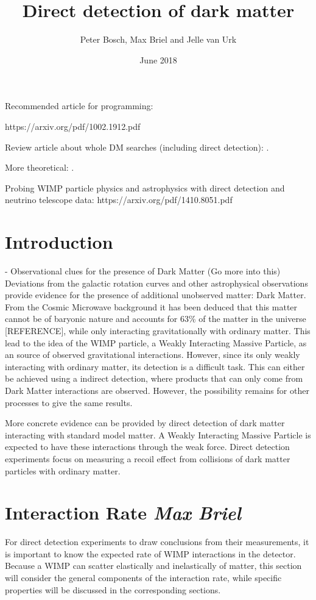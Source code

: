 \documentclass{article}
\title{Direct detection of dark matter}
\author{Peter Bosch, Max Briel and Jelle van Urk}
\date{June 2018}
\begin{document}
\maketitle

Recommended article for programming:

https://arxiv.org/pdf/1002.1912.pdf

Review article about whole DM searches (including direct detection): \cite{Roszkowski:2017nbc}.

More theoretical: \cite{Queiroz:2017kxt}.

Probing WIMP particle physics and astrophysics with direct detection and neutrino telescope data:
https://arxiv.org/pdf/1410.8051.pdf

\section{Introduction}


- Observational clues for the presence of Dark Matter (Go more into this) 
Deviations from the galactic rotation curves and other astrophysical observations provide evidence for the presence of additional unobserved matter: Dark Matter. From the Cosmic Microwave background it has been deduced that this matter cannot be of baryonic nature and accounts for 63\% of the matter in the universe [REFERENCE], while only interacting gravitationally with ordinary matter. 
This lead to the idea of the WIMP particle, a Weakly Interacting Massive Particle, as an source of observed gravitational interactions. 
However, since its only weakly interacting with ordinary matter, its detection is a difficult task. This can either be achieved using a indirect detection, where products that can only come from Dark Matter interactions are observed. However, the possibility remains for other processes to give the same results. 

More concrete evidence can be provided by direct detection of dark matter interacting with standard model matter. A Weakly Interacting Massive Particle is expected to have these interactions through the weak force. Direct detection experiments focus on measuring a recoil effect from collisions of dark matter particles with ordinary matter.

\FloatBarrier
\section{Interaction Rate \small{\textit{Max Briel}}}

For direct detection experiments to draw conclusions from their measurements, it is important to know the expected rate of WIMP interactions in the detector. Because a WIMP can scatter elastically and inelastically of matter, this section will consider the general components of the interaction rate, while specific properties will be discussed in the corresponding sections. 
\end{document}
